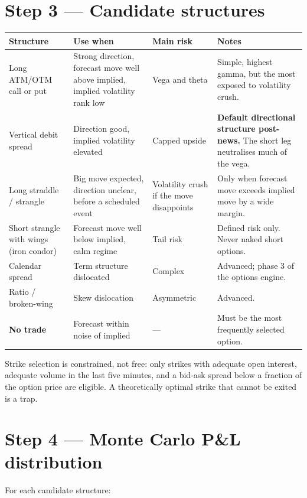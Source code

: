 \section{Step 3 --- Candidate structures}

\begin{longtable}{@{}p{3.2cm}p{3.6cm}p{3.4cm}p{3.8cm}@{}}
\toprule
\textbf{Structure} & \textbf{Use when} & \textbf{Main risk} & \textbf{Notes}\\
\midrule
Long ATM/OTM call or put & Strong direction, forecast move well above implied,
implied volatility rank low & Vega and theta & Simple, highest gamma, but the
most exposed to volatility crush.\\
Vertical debit spread & Direction good, implied volatility elevated & Capped
upside & \textbf{Default directional structure post-news.} The short leg
neutralises much of the vega.\\
Long straddle / strangle & Big move expected, direction unclear, before a
scheduled event & Volatility crush if the move disappoints & Only when forecast
move exceeds implied move by a wide margin.\\
Short strangle with wings (iron condor) & Forecast move well below implied, calm
regime & Tail risk & Defined risk only. Never naked short options.\\
Calendar spread & Term structure dislocated & Complex & Advanced; phase 3 of the
options engine.\\
Ratio / broken-wing & Skew dislocation & Asymmetric & Advanced.\\
\textbf{No trade} & Forecast within noise of implied & --- & Must be the most
frequently selected option.\\
\bottomrule
\end{longtable}

Strike selection is constrained, not free: only strikes with adequate open
interest, adequate volume in the last five minutes, and a bid-ask spread below a
fraction of the option price are eligible. A theoretically optimal strike that
cannot be exited is a trap.

\section{Step 4 --- Monte Carlo P\&L distribution}

For each candidate structure:

